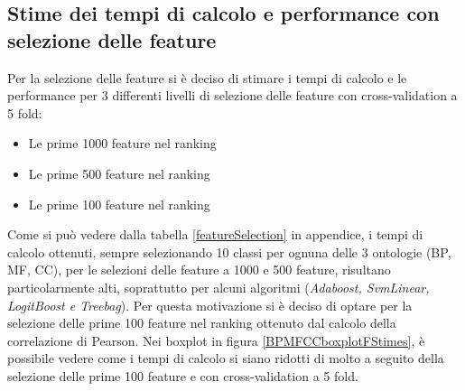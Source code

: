 \documentclass[12pt]{report}
\begin{document}
\subsection{Stime dei tempi di calcolo e performance con selezione delle feature}
Per la selezione delle feature si è deciso di stimare i tempi di calcolo e le performance per 3 differenti livelli di selezione delle feature con cross-validation a 5 fold:
\begin{itemize}
\item Le prime 1000 feature nel ranking
\item Le prime 500 feature nel ranking
\item Le prime 100 feature nel ranking 
\end{itemize}

Come si può vedere dalla tabella \ref{featureSelection} in appendice, i tempi di calcolo ottenuti, sempre selezionando 10 classi per ognuna delle 3 ontologie (BP, MF, CC), per le selezioni delle feature a 1000 e 500 feature, risultano particolarmente alti, soprattutto per alcuni algoritmi (\emph{Adaboost, SvmLinear, LogitBoost e Treebag}).
\newline
\newline
Per questa motivazione si è deciso di optare per la selezione delle prime 100 feature nel ranking ottenuto dal calcolo della correlazione di Pearson. Nei boxplot in figura \ref{BPMFCCboxplotFStimes}, è possibile vedere come i tempi di calcolo si siano ridotti di molto a seguito della selezione delle prime 100 feature e con cross-validation a 5 fold. 
\end{document}
